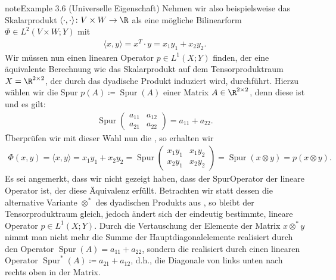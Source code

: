 \documentclass[letterpaper,10pt,english]{jupyterBook}
\begin{document}
\begin{sphinxadmonition}{note}{Example 3.6 (Universelle Eigenschaft)}
\sphinxAtStartPar
Nehmen wir also beispielsweise das Skalarprodukt \(\langle \cdot, \cdot \rangle \colon V \times W \rightarrow \R\) als eine mögliche Bilinearform \(\Phi \in L^2(V \times W; Y)\) mit
\begin{equation*}
\begin{split}\langle x, y \rangle = x^T \cdot y = x_1y_1 + x_2y_2.\end{split}
\end{equation*}
\sphinxAtStartPar
Wir müssen nun einen linearen Operator \(p \in L^1(X; Y)\) finden, der eine äquivalente Berechnung wie das Skalarprodukt auf dem Tensorproduktraum \(X = \R^{2 \times 2}\), der durch das dyadische Produkt induziert wird, durchführt.
Hierzu wählen wir die Spur \(p(A) \coloneqq \operatorname{Spur}(A)\) einer Matrix \(A \in \R^{2 \times 2}\), denn diese ist  und es gilt:
\begin{equation*}
\begin{split}\operatorname{Spur}
\begin{pmatrix}
a_{11} & a_{12} \\
a_{21} & a_{22}
\end{pmatrix}
= a_{11} + a_{22}.\end{split}
\end{equation*}
\sphinxAtStartPar
Überprüfen wir mit dieser Wahl nun die , so erhalten wir
\begin{equation*}
\begin{split}\Phi(x,y) = \langle x, y \rangle = x_1y_1 + x_2y_2 = \operatorname{Spur}
\begin{pmatrix}
x_1y_1 & x_1y_2 \\
x_2y_1 & x_2y_2
\end{pmatrix}
 = \operatorname{Spur}(x \otimes y) = p(x \otimes y).\end{split}
\end{equation*}
\sphinxAtStartPar
Es sei angemerkt, dass wir nicht gezeigt haben, dass der Spur\sphinxhyphen{}Operator der  lineare Operator ist, der diese Äquivalenz erfüllt.
Betrachten wir statt dessen die alternative Variante \(\otimes^*\) des dyadischen Produkts aus {\hyperref[\detokenize{vektoranalysis/tensor:ex:tensorproduktVarianten}]{}}, so bleibt der Tensorproduktraum gleich, jedoch ändert sich der eindeutig bestimmte, lineare Operator \(p \in L^1(X; Y)\).
Durch die Vertauschung der Elemente der Matrix \(x \otimes^* y\) nimmt man nicht mehr die Summe der Hauptdiagonalelemente realisiert durch den Operator \(\operatorname{Spur}(A) = a_{11} + a_{22}\), sondern die  realisiert durch einen linearen Operator \(\operatorname{Spur}^*(A) \coloneqq a_{21} + a_{12}\), d.h., die Diagonale von links unten nach rechts oben in der Matrix.

\end{sphinxadmonition}
\end{document}
